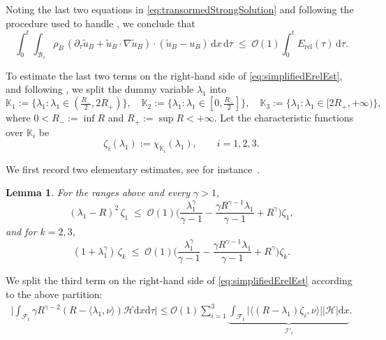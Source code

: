 \documentclass[11pt,twoside,reqno]{amsart}
\numberwithin{equation}{section}
\numberwithin{figure}{section}
\newtheorem{lemma}{Lemma}[section]
\newcommand{\qnt}[1]{\left(#1\right)}
\begin{document}
Noting the last two equations in \eqref{eq:transormedStrongSolution} and following the procedure used to handle \cite[term (4.24)]{kreml2020weak}, we conclude that
\begin{equation}\label{eq:lastterm3}
\int_0^t\!\!\int_{\mathcal{B}_\tau}
\rho_B\,(\partial_\tau \tilde{u}_B + \tilde{u}_B\cdot\nabla\tilde{u}_B)\cdot(\tilde{u}_B - u_B)\,\mathrm{d}x\,\mathrm{d}\tau
\;\le\; \mathcal{O}(1)\int_0^t E_{\mathrm{rel}}(\tau)\,\mathrm{d}\tau.
\end{equation}

To estimate the last two terms on the right-hand side of \eqref{eq:simplifiedErelEst}, and following \cite[(4.27)–(4.36)]{kreml2020weak}, we split the dummy variable \(\lambda_1\) into
\[
\mathbb{K}_1:=\bigl\{\lambda_1:\lambda_1\in(\tfrac{R_-}{2},2R_+)\bigr\},\quad
\mathbb{K}_2:=\bigl\{\lambda_1:\lambda_1\in[0,\tfrac{R_-}{2}]\bigr\},\quad
\mathbb{K}_3:=\bigl\{\lambda_1:\lambda_1\in[2R_+,+\infty)\bigr\},
\]
where \(0<R_-:=\inf R\) and \(R_+:=\sup R<+\infty\).
Let the characteristic functions over \(\mathbb{K}_i\) be
\[
\zeta_i(\lambda_1):=\chi_{\mathbb{K}_i}(\lambda_1),\qquad i=1,2,3.
\]

We first record two elementary estimates, see for instance~\cite{FJN}.

\begin{lemma}\label{lem:Dummyvariableestmates}
For the ranges above and every \(\gamma>1\),
\[
(\lambda_1-R)^2\,\zeta_1
\;\le\; \mathcal{O}(1)\Big(\frac{\lambda_1^\gamma}{\gamma-1}-\frac{\gamma R^{\gamma-1}\lambda_1}{\gamma-1}+R^\gamma\Big)\zeta_1,
\]
and for \(k=2,3\),
\[
(1+\lambda_1^\gamma)\,\zeta_k
\;\le\; \mathcal{O}(1)\Big(\frac{\lambda_1^\gamma}{\gamma-1}-\frac{\gamma R^{\gamma-1}\lambda_1}{\gamma-1}+R^\gamma\Big)\zeta_k.
\]
\end{lemma}

We split the third term on the right-hand side of \eqref{eq:simplifiedErelEst} according to the above partition:
\begin{equation}\label{eq:I1-4}
    \begin{aligned}
        \Big|\int_{\mathcal{F}_t}\gamma R^{\gamma-2}(R-\langle\lambda_1,\nu\rangle)\mathcal{H}\mathrm{d}x\mathrm{d}\tau\Big|\leq \mathcal{O}(1)\sum_{i=1}^3\underbrace{\int_{\mathcal{F}_t}\big|\langle\qnt{R-\lambda_1}\zeta_i,\nu\rangle\big|\big|\mathcal{H}\big|\mathrm{d}x}_{\mathcal{I}'_i}.
    \end{aligned}
\end{equation}
\end{document}
